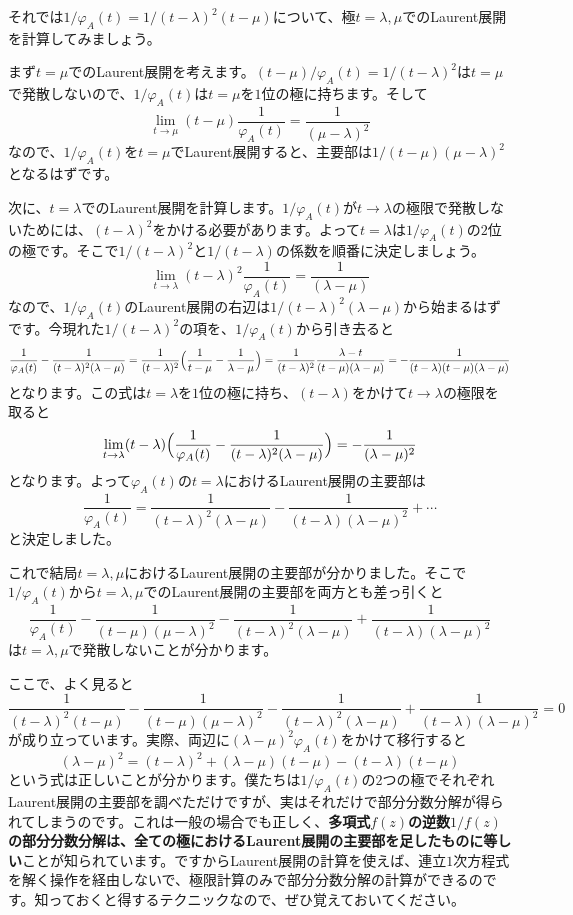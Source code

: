 それでは$1/\varphi_A(t) = 1/(t - \lambda)^2 (t - \mu)$について、極$t = \lambda, \mu$でのLaurent展開を計算してみましょう。

まず$t = \mu$でのLaurent展開を考えます。$(t - \mu)/\varphi_A(t) = 1/(t - \lambda)^2$は$t = \mu$で発散しないので、$1/\varphi_A(t)$は$t = \mu$を$1$位の極に持ちます。そして
\[
\lim_{t \rightarrow \mu} (t - \mu)\frac{1}{\varphi_A(t)} = \frac{1}{(\mu - \lambda)^2}
\]
なので、$1/\varphi_A(t)$を$t = \mu$でLaurent展開すると、主要部は$1/(t - \mu)(\mu - \lambda)^2$となるはずです。

次に、$t = \lambda$でのLaurent展開を計算します。$1/\varphi_A(t)$が$t \rightarrow \lambda$の極限で発散しないためには、$(t - \lambda)^2$をかける必要があります。よって$t = \lambda$は$1/\varphi_A(t)$の$2$位の極です。そこで$1/(t - \lambda)^2$と$1/(t - \lambda)$の係数を順番に決定しましょう。
\[
\lim_{t \rightarrow \lambda} (t - \lambda)^2 \frac{1}{\varphi_A(t)} = \frac{1}{(\lambda - \mu)}
\]
なので、$1/\varphi_A(t)$のLaurent展開の右辺は$1/(t - \lambda)^2(\lambda - \mu)$から始まるはずです。今現れた$1/(t - \lambda)^2$の項を、$1/\varphi_A(t)$から引き去ると
\[
\frac{1}{\varphi_A(t)} - \frac{1}{(t - \lambda)^2 (\lambda - \mu)}
= \frac{1}{(t - \lambda)^2} \Bigl(\frac{1}{t - \mu} - \frac{1}{\lambda - \mu}\Bigr)
= \frac{1}{(t - \lambda)^2}\frac{\lambda - t}{(t - \mu)(\lambda - \mu)}
= -\frac{1}{(t - \lambda)(t - \mu)(\lambda - \mu)}
\]
となります。この式は$t = \lambda$を$1$位の極に持ち、$(t - \lambda)$をかけて$t \rightarrow \lambda$の極限を取ると
\[
\lim_{t \rightarrow \lambda} (t - \lambda) \Bigl( \frac{1}{\varphi_A(t)} - \frac{1}{(t - \lambda)^2 (\lambda - \mu)} \Bigr)
= -\frac{1}{(\lambda - \mu)^2}
\]
となります。よって$\varphi_A(t)$の$t = \lambda$におけるLaurent展開の主要部は
\[
\frac{1}{\varphi_A(t)}
= \frac{1}{(t - \lambda)^2(\lambda - \mu)} - \frac{1}{(t - \lambda)(\lambda - \mu)^2} + \cdots
\]
と決定しました。

これで結局$t = \lambda, \mu$におけるLaurent展開の主要部が分かりました。そこで$1/\varphi_A(t)$から$t = \lambda, \mu$でのLaurent展開の主要部を両方とも差っ引くと
\[
\frac{1}{\varphi_A(t)}
- \frac{1}{(t - \mu)(\mu - \lambda)^2} - \frac{1}{(t - \lambda)^2(\lambda - \mu)} + \frac{1}{(t - \lambda)(\lambda - \mu)^2}
\]
は$t = \lambda, \mu$で発散しないことが分かります。

ここで、よく見ると
\[
\frac{1}{(t - \lambda)^2(t - \mu)}
- \frac{1}{(t - \mu)(\mu - \lambda)^2} - \frac{1}{(t - \lambda)^2(\lambda - \mu)} + \frac{1}{(t - \lambda)(\lambda - \mu)^2} = 0
\]
が成り立っています。実際、両辺に$(\lambda - \mu)^2\varphi_A(t)$をかけて移行すると
\[
(\lambda - \mu)^2 = (t - \lambda)^2 + (\lambda - \mu)(t - \mu) - (t - \lambda)(t - \mu)
\]
という式は正しいことが分かります。僕たちは$1/\varphi_A(t)$の$2$つの極でそれぞれLaurent展開の主要部を調べただけですが、実はそれだけで部分分数分解が得られてしまうのです。これは一般の場合でも正しく、\textbf{多項式$f(z)$の逆数$1/f(z)$の部分分数分解は、全ての極におけるLaurent展開の主要部を足したものに等しい}ことが知られています。ですからLaurent展開の計算を使えば、連立$1$次方程式を解く操作を経由しないで、極限計算のみで部分分数分解の計算ができるのです。知っておくと得するテクニックなので、ぜひ覚えておいてください。

